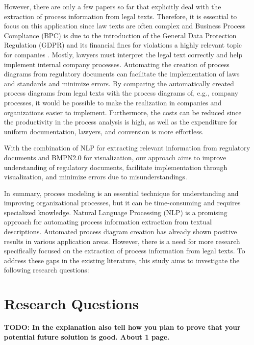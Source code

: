 However, there are only a few papers so far that explicitly deal with the extraction of process information from legal texts. Therefore, it is essential to focus on this application since law texts are often complex and Business Process Compliance (BPC) is due to the introduction of the General Data Protection Regulation (GDPR) and its financial fines for violations a highly relevant topic for companies \cite{sunDesigntimeBusinessProcess2023}.  Mostly, lawyers must interpret the legal text correctly and help implement internal company processes. Automating the creation of process diagrams from regulatory documents can facilitate the implementation of laws and standards and minimize errors. By comparing the automatically created process diagrams from legal texts with the process diagrams of, e.g., company processes, it would be possible to make the realization in companies and organizations easier to implement. Furthermore, the costs can be reduced since the productivity in the process analysis is high, as well as the expenditure for uniform documentation, lawyers, and conversion is more effortless.

With the combination of NLP for extracting relevant information from regulatory documents and BMPN2.0 for visualization, our approach aims to improve understanding of regulatory documents, facilitate implementation through visualization, and minimize errors due to misunderstandings. 

In summary, process modeling is an essential technique for understanding and improving organizational processes, but it can be time-consuming and requires specialized knowledge. Natural Language Processing (NLP) is a promising approach for automating process information extraction from textual descriptions. Automated process diagram creation has already shown positive results in various application areas. However, there is a need for more research specifically focused on the extraction of process information from legal texts. To address these gaps in the existing literature, this study aims to investigate the following research questions:
\pagebreak

\section{Research Questions}
\label{sec:intro:rq}
 \textbf{TODO: In the explanation also tell how you plan to prove that your potential future solution is good. About 1 page.}
 
